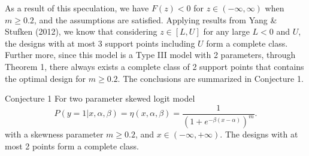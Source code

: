 \documentclass[12pt]{TD-CJS}
\begin{document}
As a result of this speculation, we have $F(z)<0$ for $z\in (-\infty,\infty)$ when $m\ge 0.2$, and the assumptions are satisfied. Applying results from Yang \& Stufken (2012), we know that considering $z\in[L,U]$ for any large $L<0$ and $U$, the designs with at most 3 support points including $U$ form a complete class. Further more, since this model is a Type III model with 2 parameters, through Theorem 1, there always exists a complete class of 2 support points that contains the optimal design for $m\ge0.2$. The conclusions are summarized in Conjecture 1.

     

\begin{theorem}{Conjecture 1}{}\label{skew}
For two parameter skewed logit model\[
P(y=1|x,\alpha,\beta) = \eta(x,\alpha,\beta)= \frac{1}{(1+e^{-\beta(x-\alpha)})^m}.
\]with a skewness parameter $m\ge0.2$, and $x\in (-\infty,+\infty)$. The designs with at most 2 points form a complete class.
\end{theorem}
\end{document}
